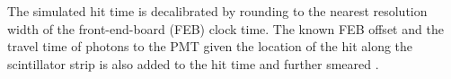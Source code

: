 
The simulated hit time is decalibrated by rounding to the nearest resolution width of the front-end-board (FEB) clock time. The known FEB offset and the travel time of photons to the PMT given the location of the hit along the scintillator strip is also added to the hit time and further smeared \cite{MarshallThesis2016}. 













